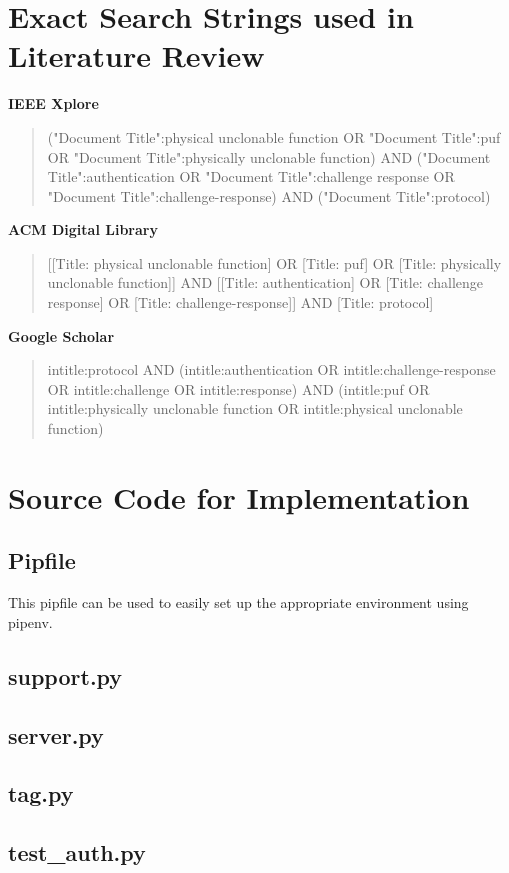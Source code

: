 \section{Exact Search Strings used in Literature Review}
\label{sec:appendix_search_strings}

\textbf{IEEE Xplore}
\begin{quote}
      ("Document Title":physical unclonable function OR "Document Title":puf OR "Document Title":physically unclonable function) AND ("Document Title":authentication OR "Document Title":challenge response OR "Document Title":challenge-response) AND ("Document Title":protocol)
\end{quote}

\textbf{ACM Digital Library}
\begin{quote}
      [[Title: physical unclonable function] OR [Title: puf] OR [Title: physically unclonable function]] AND [[Title: authentication] OR [Title: challenge response] OR [Title: challenge-response]] AND [Title: protocol]
\end{quote}

\textbf{Google Scholar}
\begin{quote}
      intitle:protocol AND (intitle:authentication OR intitle:challenge-response OR intitle:challenge OR intitle:response) AND (intitle:puf OR intitle:physically unclonable function OR intitle:physical unclonable function)
\end{quote}


\newpage
\section{Source Code for Implementation}
\label{sec:appendix_code}
\subsection{Pipfile}
This pipfile can be used to easily set up the appropriate environment using pipenv.


\subsection{support.py}


\subsection{server.py}


\subsection{tag.py}


\subsection{test\_auth.py}
